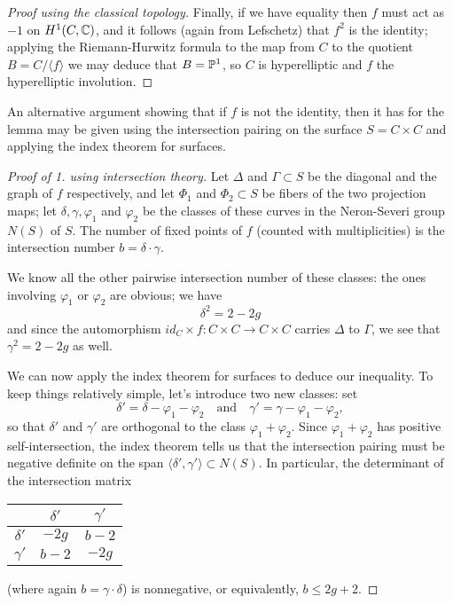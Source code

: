 \begin{proof}[Proof  using the classical topology]
Finally, if we have equality then $f$ must act as $-1$ on $H^1(C,\CC)$,  and it follows (again from Lefschetz) that $f^2$ is the identity; applying the Riemann-Hurwitz formula to the map from $C$ to the quotient $B = C/\langle f \rangle$ we may deduce that $B = \PP^1$, so $C$ is hyperelliptic and $f$ the hyperelliptic involution.
\end{proof}

An alternative argument showing that if $f$ is not the identity, then it has  for the lemma may be given using the intersection pairing on the surface $S = C \times C$ and applying the index theorem for surfaces.

\begin{proof}[Proof of 1. using intersection theory]
Let $\Delta$ and $\Gamma \subset S$ be the diagonal and the graph of $f$ respectively, and let $\Phi_1$ and $\Phi_2 \subset S$ be fibers of the two projection maps; let $\delta, \gamma, \varphi_1$ and $\varphi_2$ be the classes of these curves in the Neron-Severi group $N(S)$  of $S$. The number of fixed points of $f$ (counted with multiplicities) is the intersection number  $b = \delta \cdot \gamma$.

We know all the other pairwise intersection number of these classes: the ones involving $\varphi_1$ or $\varphi_2$ are obvious; we have
$$
\delta^2 = 2 - 2g
$$
and since the automorphism $id_C \times f : C\times C \to C \times C$ carries $\Delta$ to $\Gamma$, we see that $\gamma^2 = 2-2g$ as well.

We can now apply the index theorem for surfaces to deduce our inequality. To keep things relatively simple, let's introduce two new classes: set
$$
\delta' = \delta - \varphi_1 - \varphi_2 \quad \text{and} \quad \gamma' = \gamma - \varphi_1 - \varphi_2,
$$
so that $\delta'$ and $\gamma'$ are orthogonal to the class $\varphi_1 + \varphi_2$. Since $\varphi_1 + \varphi_2$ has positive self-intersection, the index theorem tells us that the intersection pairing must be negative definite on the span $\langle \delta',\gamma' \rangle \subset N(S)$. In particular, the determinant of the intersection matrix
\begin{center}
\begin{tabular}{c|c|c}
& $\delta'$ &  $\gamma'$  \\
\hline
$\delta'$ & $-2g$ & $b-2$ \\
\hline
$\gamma'$ & $b-2$ & $-2g$ 
\end{tabular}
\end{center}
(where again $b = \gamma \cdot \delta$) is nonnegative, or equivalently, $b\leq 2g+2$.
\end{proof}

